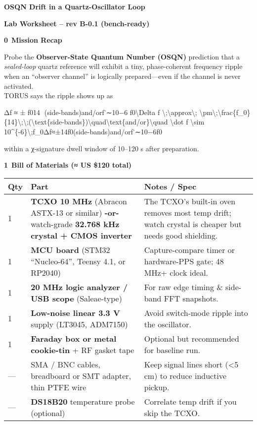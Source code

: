 \documentclass[]{article}
\date{}
\begin{document}
\textbf{OSQN Drift in a Quartz-Oscillator Loop}

\textbf{Lab Worksheet -- rev B-0.1 (bench-ready)}

\textbf{0 Mission Recap}

Probe the \textbf{Observer-State Quantum Number (OSQN)} prediction that
a \emph{sealed-loop} quartz reference will exhibit a tiny,
phase-coherent frequency ripple when an ``observer channel'' is
logically prepared---even if the channel is never activated.\\
TORUS says the ripple shows up as

Δf  ≈  ±  f014    (side-bands)and/orf˙∼10−6  f0\textbackslash{}Delta f
\textbackslash{};\textbackslash{}approx\textbackslash{};
\textbackslash{}pm\textbackslash{};\textbackslash{}frac\{f\_0\}\{14\}\textbackslash{};\textbackslash{};(\textbackslash{}text\{side-bands\})\textbackslash{}quad\textbackslash{}text\{and/or\}\textbackslash{}quad
\textbackslash{}dot f \textbackslash{}sim
10\^{}\{-6\}\textbackslash{};f\_0Δf≈±14f0​​(side-bands)and/orf˙​∼10−6f0​

within a χ-signature dwell window of 10--120 s after preparation.

\textbf{1 Bill of Materials (≈ US \$120 total)}

\begin{longtable}[]{@{}lll@{}}
\toprule
\textbf{Qty} & \textbf{Part} & \textbf{Notes / Spec}\tabularnewline
\midrule
\endhead
1 & \textbf{TCXO 10 MHz} (Abracon ASTX-13 or similar) \textbf{-or-}
watch-grade \textbf{32.768 kHz crystal + CMOS inverter} & The TCXO's
built-in oven removes most temp drift; watch crystal is cheaper but
needs good shielding.\tabularnewline
1 & \textbf{MCU board} (STM32 ``Nucleo-64'', Teensy 4.1, or RP2040) &
Capture-compare timer or hardware-PPS gate; 48 MHz+ clock
ideal.\tabularnewline
1 & \textbf{20 MHz logic analyzer / USB scope} (Saleae-type) & For raw
edge timing \& side-band FFT snapshots.\tabularnewline
1 & \textbf{Low-noise linear 3.3 V} supply (LT3045, ADM7150) & Avoid
switch-mode ripple into the oscillator.\tabularnewline
1 & \textbf{Faraday box or metal cookie-tin} + RF gasket tape & Optional
but recommended for baseline run.\tabularnewline
--- & SMA / BNC cables, breadboard or SMT adapter, thin PTFE wire & Keep
signal lines short (\textless{}5 cm) to reduce inductive
pickup.\tabularnewline
--- & \textbf{DS18B20} temperature probe (optional) & Correlate temp
drift if you skip the TCXO.\tabularnewline
\bottomrule
\end{longtable}
\end{document}
